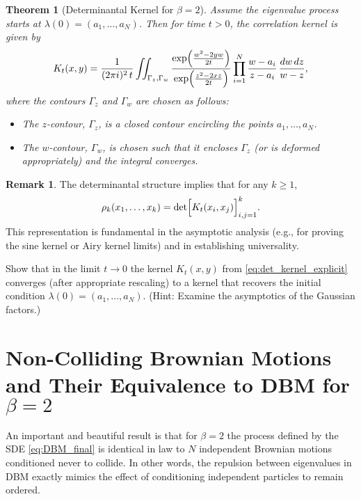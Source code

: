 \documentclass[letterpaper,11pt,oneside,reqno]{article}
\numberwithin{equation}{section}
\newtheorem{theorem}[proposition]{Theorem}
\theoremstyle{definition}
\newtheorem{remark}[proposition]{Remark}
\begin{document}
\begin{theorem}[Determinantal Kernel for \(\beta=2\)]
\label{thm:det_kernel}
Assume the eigenvalue process starts at \(\lambda(0)=(a_1,\dots,a_N)\). Then for time \(t>0\), the correlation kernel is given by
\begin{equation}
\label{eq:det_kernel_explicit}
K_t(x,y)=\frac{1}{(2\pi i)^2\,t}\iint_{\Gamma_z,\Gamma_w} \frac{\exp\Bigl(\frac{w^2-2yw}{2t}\Bigr)}{\exp\Bigl(\frac{z^2-2xz}{2t}\Bigr)}
\prod_{i=1}^N \frac{w-a_i}{z-a_i}\,\frac{dw\,dz}{w-z},
\end{equation}
where the contours \(\Gamma_z\) and \(\Gamma_w\) are chosen as follows:
\begin{itemize}
    \item The \(z\)-contour, \(\Gamma_z\), is a closed contour encircling the points \(a_1,\dots,a_N\).
    \item The \(w\)-contour, \(\Gamma_w\), is chosen such that it encloses \(\Gamma_z\) (or is deformed appropriately) and the integral converges.
\end{itemize}
\end{theorem}

\begin{remark}
The determinantal structure implies that for any \(k\ge1\),
\[
\rho_k(x_1,\dots,x_k)=\det\Bigl[K_t(x_i,x_j)\Bigr]_{i,j=1}^k.
\]
This representation is fundamental in the asymptotic analysis (e.g., for proving the sine kernel or Airy kernel limits) and in establishing universality.
\end{remark}

\begin{exercise}
Show that in the limit \(t\to 0\) the kernel \(K_t(x,y)\) from \eqref{eq:det_kernel_explicit} converges (after appropriate rescaling) to a kernel that recovers the initial condition \(\lambda(0)=(a_1,\dots,a_N)\). (Hint: Examine the asymptotics of the Gaussian factors.)
\end{exercise}

\section{Non-Colliding Brownian Motions and Their Equivalence to DBM for \(\beta=2\)}

An important and beautiful result is that for \(\beta=2\) the process defined by the SDE \eqref{eq:DBM_final} is identical in law to \(N\) independent Brownian motions conditioned never to collide. In other words, the repulsion between eigenvalues in DBM exactly mimics the effect of conditioning independent particles to remain ordered.
\end{document}
